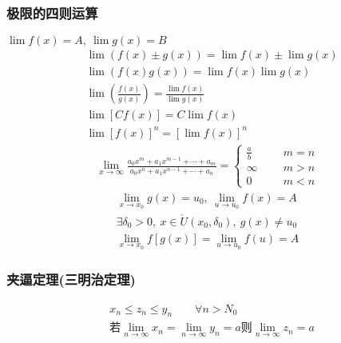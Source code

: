 \subsubsection{极限的四则运算}
$\lim f(x)=A,\ \lim g(x)=B$
\begin{align}
&\lim{(f(x)\pm g(x))} = \lim f(x)\pm\lim g(x) \label{Extreme Four Operations_1}\\
&\lim{(f(x) g(x))} = \lim f(x)\lim g(x) \label{Extreme Four Operations_2}\\
&\lim \left(\frac{f(x)}{g(x)}\right)= \frac{\lim{f(x)}}{\lim{g(x)}} \label{Extreme Four Operations_3}\\
&\lim\left[Cf(x)\right]=C\lim f(x)\\
&\lim\left[f(x)\right]^n=\left[\lim f(x)\right]^n
\end{align}
\begin{align}
    \lim\limits_{x\to \infty}\frac{a_0x^m+a_1x^{m-1}+\cdots +a_m}{a_0x^n+a_1x^{n-1}+\cdots +a_n}=\begin{cases}
        \frac{a}{b}\qquad &m=n\\
        \infty &m>n\\
        0 &m<n
    \end{cases}
\end{align}
\begin{equation}
    \begin{split}
        \lim\limits_{x\to x_0}g(x)=u_0,\ \lim\limits_{u\to u_0}f(x)=A\\
        \exists \delta_0>0,\ x\in \mathring{U}\left(x_0,\delta_0\right),\ g(x)\neq u_0\\
        \lim\limits_{x\to x_0}f\left[g(x)\right]=\lim\limits_{u\to u_0}f(u)=A
    \end{split}
\end{equation}

\subsubsection{夹逼定理(三明治定理)}
\vspace{-4mm}
\begin{equation}\label{eq:squeeze_theorem}
\begin{split}
&x_n\leqslant z_n\leqslant y_n \qquad \forall n>N_0 \\
&\mbox{若}\lim\limits_{n\to{\infty}}x_n = \lim\limits_{n\to\infty}y_n = a \mbox{则}\lim\limits_{n\to\infty}z_n = a
\end{split}
\end{equation}
